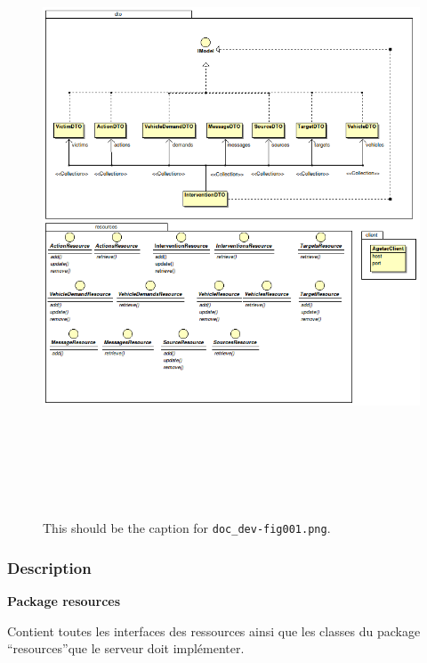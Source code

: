 \documentclass{article}
\begin{document}
\begin{figure}[htbp]
\begin{center}
\includegraphics[width=494pt, height=521pt]{doc_dev-fig001.png}
\caption{This should be the caption for \texttt{doc\_dev-fig001.png}.}
\end{center}
\end{figure}\label{h.pb7kurfacmpb}

\vspace{27pt}
\subsubsection*{{\color{color02} \textbf{Description\label{h.ggq4v6pv3yg7}}}}

\vspace{13pt}
{\color{color01} \textbf{Package resources}}

{\color{color01} Contient toutes les interfaces des ressources ainsi que les classes 
du package ``resources''que le serveur doit implémenter.}
\end{document}
